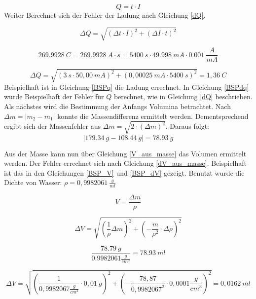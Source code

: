 \begin{equation}
Q = t \cdot I
\label{q_aus_tI}
\end{equation}
Weiter Berechnet sich der Fehler der Ladung nach Gleichung \ref{dQ}.

\begin{equation}
\Delta Q=\sqrt{\left(\Delta t\cdot I\right)^2 + \left(\Delta I\cdot t\right)^2}
\label{dQ}
\end{equation}

\begin{equation}
 269.9928\ C = 269.9928\ A\cdot s = 5400\ s \cdot 49.998\ mA \cdot 0.001\ \frac{A}{mA}
\label{BSPq}
\end{equation}

\begin{equation}
\Delta Q=\sqrt{\left(3\ s\cdot 50,00\ mA\right)^2 + \left(0,00025\ mA\cdot 5400\ s\right)^2}= 1,36\ C
\label{BSPdq}
\end{equation}
Beispielhaft ist in Gleichung \ref{BSPq} die Ladung errechnet.
In Gleichung \ref{BSPdq} wurde Beispielhaft der Fehler für $Q$ berechnet, wie in Gleichung \ref{dQ} beschrieben.
\\
Als nächstes wird die Bestimmung der Anfangs Volumina betrachtet.
Nach $\Delta m = \left| m_2 - m_1\right|$ konnte die Massendifferenz ermittelt werden.
Dementsprechend ergibt sich der Massenfehler aus $\Delta m=\sqrt{2\cdot (\Delta m)^2}$. Daraus folgt: 
 $$\left|179.34\ g - 108.44\ g\right|= 78.93\ g$$

Aus der Masse kann nun über Gleichung \ref{V_aus_masse} das Volumen ermittelt werden. 
Der Fehler errechnet sich nach Gleichung \ref{dV_aus_masse}. Beispielhaft ist das in den Gleichungen \ref{BSP_V} und \ref{BSP_dV} gezeigt.
Benutzt wurde die Dichte von Wasser: $\rho=0,9982061\ \frac{g}{ml}$\cite{DichteWasser}

\begin{equation}
V= \frac{\Delta m}{\rho}
\label{V_aus_masse}
\end{equation}

\begin{equation}
\Delta V=\sqrt{\left(\frac{1}{\rho}\Delta m\right)^2 + \left(-\frac{m}{\rho^2}\cdot\Delta\rho\right)^2}
\label{dV_aus_masse}
\end{equation}

\begin{equation}
\frac{78.79\ g}{0.9982061\frac{g}{cm^3}} = 78.93\ ml
\label{BSP_V}
\end{equation}

\begin{equation}
\Delta V=\sqrt{\left(\frac{1}{0,9982067\frac{g}{cm^3}}\cdot 0,01\ g\right)^2 + \left(-\frac{78,87}{0,9982067^2}\cdot0,0001\frac{g}{cm^3}\right)^2}=0,0162\ ml
\label{BSP_dV}
\end{equation}

